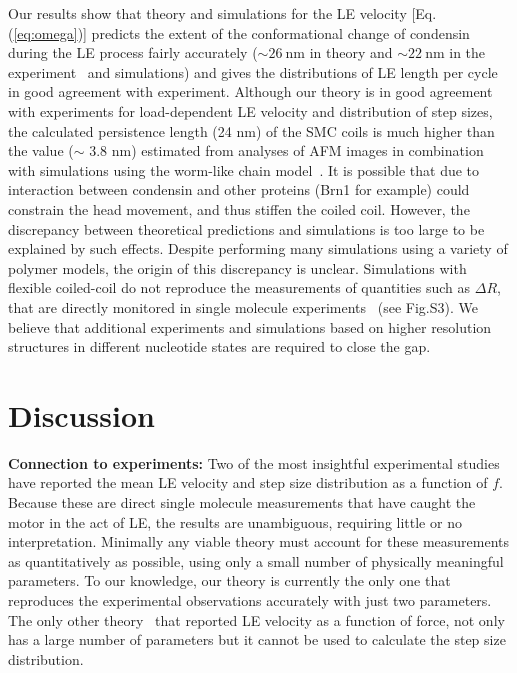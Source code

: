 \documentclass[fleqn,10pt]{wlscirep}
\newcommand{\nm}{\ \mathrm{nm}}
\newcommand{\vR}{R}
\newcommand{\vL}{L}
\begin{document}
Our results show that theory and simulations for the LE velocity [Eq.(\ref{eq:omega})] predicts the extent of the conformational change of condensin during the LE process fairly accurately ($\sim 26\nm$ in theory and $\sim 22\nm$ in the experiment~\cite{ryu2020condensin} and simulations) and gives the distributions of LE length per cycle in good agreement with experiment. 
Although our theory is in good agreement with experiments for load-dependent LE velocity and distribution of step sizes, the calculated persistence length (24 nm) of the SMC coils is much higher than the value ($\sim$ 3.8 nm) estimated from analyses of AFM images in combination with simulations using the worm-like chain model~\cite{eeftens2016condensin}. It is possible that due to interaction between condensin and other proteins (Brn1 for example) could constrain the head movement, and thus stiffen the coiled coil. However, the discrepancy between theoretical predictions and simulations is  too large to be explained by such effects.  Despite performing many simulations using a variety of polymer models, the origin of this discrepancy is unclear. Simulations with flexible coiled-coil do not  reproduce the measurements of quantities such as $\Delta R$, that are directly monitored in single molecule experiments~\cite{ryu2020condensin} (see Fig.S3). We believe that additional experiments and simulations based on higher resolution structures in different nucleotide states are required to close the gap.


\section*{Discussion}
{\bf Connection to experiments:}
Two of the most insightful experimental studies~\cite{ryu2020condensin,ryu2020resolving} have reported the mean LE velocity and step size distribution as a function of $f$.  Because these are direct single molecule measurements that have caught the motor in the act of LE, the results are unambiguous, requiring little or no interpretation.  Minimally any viable theory must account for these measurements as quantitatively as possible,  using only a small number of physically meaningful parameters. To our knowledge, our theory is currently the only one that reproduces the experimental observations accurately with just two parameters. The only other theory~\cite{marko2019dna} that reported LE velocity as a function of force, not only has a large number of parameters but it cannot be used to calculate the step size distribution.
\end{document}
